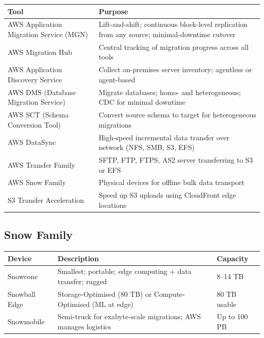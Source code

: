 \begin{comparebox}[title={Migration tools}]
\begin{tabular}{@{}p{4cm}p{8cm}@{}}
\toprule
\textbf{Tool} & \textbf{Purpose} \\
\midrule
AWS Application Migration Service (MGN) & Lift-and-shift; continuous block-level replication from any source; minimal-downtime cutover \\
AWS Migration Hub                        & Central tracking of migration progress across all tools \\
AWS Application Discovery Service       & Collect on-premises server inventory; agentless or agent-based \\
AWS DMS (Database Migration Service)    & Migrate databases; homo- and heterogeneous; CDC for minimal downtime \\
AWS SCT (Schema Conversion Tool)        & Convert source schema to target for heterogeneous migrations \\
AWS DataSync                            & High-speed incremental data transfer over network (NFS, SMB, S3, EFS) \\
AWS Transfer Family                     & SFTP, FTP, FTPS, AS2 server transferring to S3 or EFS \\
AWS Snow Family                         & Physical devices for offline bulk data transport \\
S3 Transfer Acceleration                & Speed up S3 uploads using CloudFront edge locations \\
\bottomrule
\end{tabular}
\end{comparebox}

\subsection{Snow Family}

\begin{comparebox}[title={Snow Family devices}]
\begin{tabular}{@{}p{3.5cm}p{5.5cm}p{3cm}@{}}
\toprule
\textbf{Device} & \textbf{Description} & \textbf{Capacity} \\
\midrule
Snowcone        & Smallest; portable; edge computing + data transfer; rugged        & 8--14 TB \\
Snowball Edge   & Storage-Optimised (80 TB) or Compute-Optimised (ML at edge)       & 80 TB usable \\
Snowmobile      & Semi-truck for exabyte-scale migrations; AWS manages logistics     & Up to 100 PB \\
\bottomrule
\end{tabular}
\end{comparebox}

